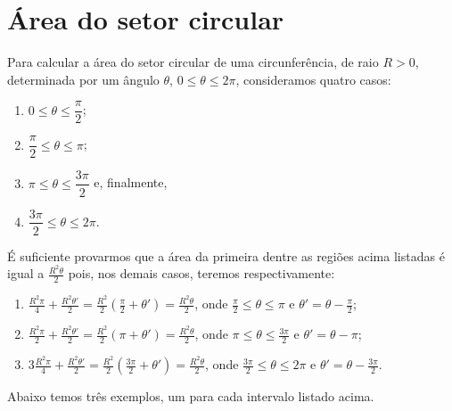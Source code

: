 \section{Área do setor circular}\label{sec:area-do-setor-circular}

Para calcular a área do setor circular de uma circunferência, de raio \(R>0\),
determinada por um ângulo \(\theta\), \(0\leqslant{\theta}\leqslant{2\pi}\),
consideramos quatro casos:

\begin{enumerate}
  \item
    \(0\leqslant{\theta}\leqslant{\dfrac{\pi}{2}}\);
  \item
    \(\dfrac{\pi}{2}\leqslant{\theta}\leqslant{\pi}\);
  \item
    \(\pi\leqslant{\theta}\leqslant{\dfrac{3\pi}{2}}\) e, finalmente,
  \item
    \(\dfrac{3\pi}{2}\leqslant{\theta}\leqslant{2\pi}\).
\end{enumerate}

É suficiente provarmos que a área da primeira dentre as regiões acima listadas é
igual a \(\frac{R^{2}\theta}{2}\) pois, nos demais casos, teremos
respectivamente:

\begin{enumerate}
  \item
    \(\frac{R^{2}\pi}{4}+\frac{R^{2}\theta'}{2}=\frac{R^{2}}{2}\left(\frac{\pi}{2}+\theta'\right)=\frac{R^{2}\theta}{2}\),
    onde \(\frac{\pi}{2}\leqslant{\theta}\leqslant{\pi}\) e \(\theta'=\theta-\frac{\pi}{2}\);
  \item
    \(\frac{R^{2}\pi}{2}+\frac{R^{2}\theta'}{2}=\frac{R^{2}}{2}\left(\pi+\theta'\right)=\frac{R^{2}\theta}{2}\),
    onde \(\pi\leqslant{\theta}\leqslant{\frac{3\pi}{2}}\) e \(\theta'=\theta-\pi\);
  \item
    \(3\frac{R^{2}\pi}{4}+\frac{R^{2}\theta'}{2}=\frac{R^{2}}{2}\left(\frac{3\pi}{2}+\theta'\right)=\frac{R^{2}\theta}{2}\),
    onde \(\frac{3\pi}{2}\leqslant{\theta}\leqslant{2\pi}\) e \(\theta'=\theta-\frac{3\pi}{2}\).
\end{enumerate}

Abaixo temos três exemplos, um para cada intervalo listado acima.

\begin{figure}[H]
  \centering
\end{figure}

